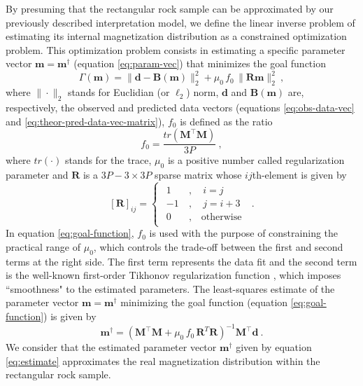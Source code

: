 \documentclass[draft,gc]{agutex}
\begin{document}
\begin{article}
By presuming that the rectangular rock sample can
be approximated by our previously described 
interpretation model, we define the linear inverse
problem of estimating its internal magnetization
distribution as a constrained optimization problem.
This optimization problem consists in 
estimating a specific parameter vector 
$\mathbf{m} = \mathbf{m}^{\dagger}$ (equation \ref{eq:param-vec}) 
that minimizes the goal function
\begin{equation}
\Gamma(\mathbf{m}) =
\| \mathbf{d} - \mathbf{B}(\mathbf{m}) \|_{2}^{2} + 
\mu_0 \, f_0 \, \| \mathbf{R} \mathbf{m} \|_{2}^{2} \: ,
\label{eq:goal-function}
\end{equation}
where $\| \cdot \|_{2}$ stands for Euclidian (or $\ell_{2}$) norm, 
$\mathbf{d}$ and $\mathbf{B}(\mathbf{m})$ are,
respectively, the observed and predicted data vectors
(equations \ref{eq:obs-data-vec} and \ref{eq:theor-pred-data-vec-matrix}),
$f_0$ is defined as the ratio 
\begin{equation}
f_0 = \frac{tr \left( \mathbf{M}^{\top}\mathbf{M} \right)}{3P} \: ,
\end{equation}
where $tr \left( \cdot \right)$ stands for the trace,
$\mu_0$ is a positive number called regularization parameter and
$\mathbf{R}$ is a $3P-3 \times 3P$ sparse matrix 
whose $ij$th-element is given by
\begin{equation}
\left[ \mathbf{R} \right]_{ij} = 
\begin{cases}
\begin{split}
1 &\: , \quad i = j \\
-1 &\: , \quad j = i+3 \\
0 &\: , \quad \text{otherwise}
\end{split}
\end{cases} \: .
\label{eq:elements_matrix}
\end{equation}
In equation \ref{eq:goal-function}, $f_0$ is used with
the purpose of constraining the practical range of $\mu_0$,
which controls the trade-off between 
the first and second terms at the right side. 
The first term represents the data fit
and the second term is the well-known first-order Tikhonov regularization 
function \citep{aster2005}, which imposes
``smoothness" to the estimated parameters.
The least-squares estimate of the parameter vector 
$\mathbf{m} = \mathbf{m}^{\dagger}$ minimizing 
the goal function (equation \ref{eq:goal-function}) is given by
\begin{equation}
\mathbf{m}^{\dagger} = \left( \mathbf{M}^{\top}\mathbf{M} + \mu_0 \, f_0 \,  
\mathbf{R}^T \mathbf{R}\right)^{-1}
\mathbf{M}^{\top}\mathbf{d} \: .
\label{eq:estimate}
\end{equation}
We consider that the estimated parameter vector $\mathbf{m}^{\dagger}$
given by equation \ref{eq:estimate} approximates the real magnetization 
distribution within the rectangular rock sample.


\end{article}
\end{document}
